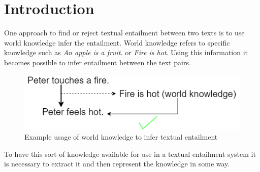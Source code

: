 \begingroup
\renewcommand{\cleardoublepage}{}
\renewcommand{\clearpage}{}
\chapter{Introduction}
\endgroup

One approach to find or reject textual entailment between two texts is to use world knowledge infer the entailment. World knowledge refers to specific knowledge such as \textit{An apple is a fruit.} or \textit{Fire is hot}. Using this information it becomes possible to infer entailment between the text pairs.
\begin{minipage}{0.6\textwidth}
\begin{figure}[H]
    \centering
    \includegraphics[scale=0.53]{fig/world_knowledge}
    \caption{Example usage of world knowledge to infer textual entailment}
    \label{fig:world-knowledge}
\end{figure}
\end{minipage}
\begin{minipage}{0.4\textwidth}
To have this sort of knowledge available for use in a textual entailment system it is necessary to extract it and then represent the knowledge in some way.\\
\end{minipage}
